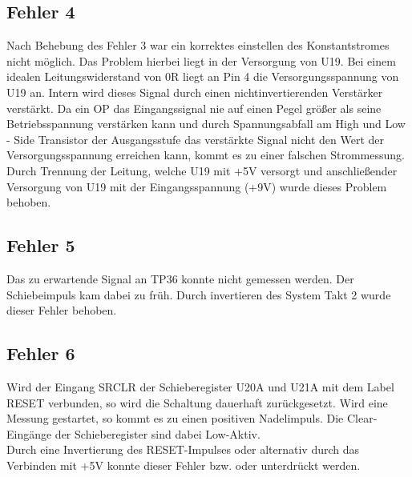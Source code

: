 \subsection{Fehler 4}

Nach Behebung des \glqq Fehler 3 \grqq{} war ein korrektes einstellen des Konstantstromes nicht möglich. Das Problem hierbei liegt in der Versorgung von U19. Bei einem idealen Leitungswiderstand von 0R liegt an Pin 4 die Versorgungsspannung von U19 an. Intern wird dieses Signal durch einen \glqq nichtinvertierenden Verstärker \grqq{} verstärkt. Da ein OP das Eingangssignal nie auf einen Pegel größer als seine Betriebsspannung verstärken kann und durch Spannungsabfall am \glqq High und Low - Side Transistor\grqq{} der Ausgangsstufe das verstärkte Signal nicht den Wert der Versorgungsspannung erreichen kann, kommt es zu einer falschen Strommessung. Durch Trennung der Leitung, welche U19 mit +5V versorgt und anschließender Versorgung von U19 mit der Eingangsspannung (+9V) wurde dieses Problem behoben. 

\newpage

\subsection{Fehler 5}

Das zu erwartende Signal an TP36 konnte nicht gemessen werden. Der Schiebeimpuls kam dabei zu früh. Durch invertieren des \glqq System Takt 2 \grqq{} wurde dieser Fehler behoben.



\subsection{Fehler 6}


Wird der Eingang \glqq SRCLR \grqq{} der Schieberegister U20A und U21A mit dem Label \glqq RESET \grqq{} verbunden, so wird die Schaltung dauerhaft zurückgesetzt. 
Wird eine Messung gestartet, so kommt es zu einen positiven Nadelimpuls. Die \glqq Clear-Eingänge \grqq{} der Schieberegister sind dabei Low-Aktiv. 
\\
Durch eine Invertierung des RESET-Impulses oder alternativ durch das Verbinden mit +5V konnte dieser Fehler bzw. oder unterdrückt werden.
